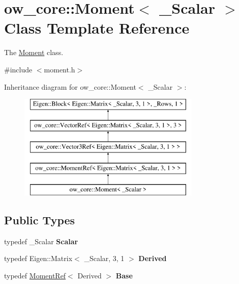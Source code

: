 \hypertarget{classow__core_1_1Moment}{}\section{ow\+\_\+core\+:\+:Moment$<$ \+\_\+\+Scalar $>$ Class Template Reference}
\label{classow__core_1_1Moment}


The \hyperlink{classow__core_1_1Moment}{Moment} class.  




{\ttfamily \#include $<$moment.\+h$>$}

Inheritance diagram for ow\+\_\+core\+:\+:Moment$<$ \+\_\+\+Scalar $>$\+:\begin{figure}[H]
\begin{center}
\leavevmode
\includegraphics[height=5.000000cm]{da/d30/classow__core_1_1Moment}
\end{center}
\end{figure}
\subsection*{Public Types}
\begin{DoxyCompactItemize}
\item 
typedef \+\_\+\+Scalar {\bfseries Scalar}\hypertarget{classow__core_1_1Moment_a1b7a49145338008bf7346342cdda0549}{}\label{classow__core_1_1Moment_a1b7a49145338008bf7346342cdda0549}

\item 
typedef Eigen\+::\+Matrix$<$ \+\_\+\+Scalar, 3, 1 $>$ {\bfseries Derived}\hypertarget{classow__core_1_1Moment_a5974580adf3f59f807961230b8833cf8}{}\label{classow__core_1_1Moment_a5974580adf3f59f807961230b8833cf8}

\item 
typedef \hyperlink{classow__core_1_1MomentRef}{Moment\+Ref}$<$ Derived $>$ {\bfseries Base}\hypertarget{classow__core_1_1Moment_a858ac794296e7f501f7e25566b36dc44}{}\label{classow__core_1_1Moment_a858ac794296e7f501f7e25566b36dc44}

\end{DoxyCompactItemize}
